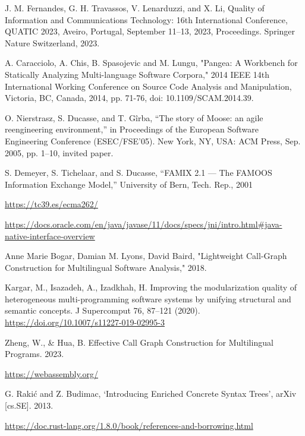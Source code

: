 \begin{thebibliography}{00}
    J. M. Fernandes, G. H. Travassos, V. Lenarduzzi, and X. Li, 
    Quality of Information and Communications Technology: 
    16th International Conference, QUATIC 2023,
    Aveiro, Portugal, September 11--13, 2023,
    Proceedings. Springer Nature Switzerland, 2023.

    A. Caracciolo, A. Chis, B. Spasojevic and
    M. Lungu, "Pangea: A Workbench for Statically Analyzing Multi-language Software Corpora,"
    2014 IEEE 14th International Working Conference on Source Code Analysis
    and Manipulation, Victoria, BC, Canada, 2014,
    pp. 71-76, doi: 10.1109/SCAM.2014.39.

    O. Nierstrasz, S. Ducasse, and T. Gîrba, “The story of Moose: an
    agile reengineering environment,” in Proceedings of the European
    Software Engineering Conference (ESEC/FSE’05). New York, NY,
    USA: ACM Press, Sep. 2005, pp. 1–10, invited paper.

    S. Demeyer, S. Tichelaar, and S. Ducasse, “FAMIX 2.1 — The FAMOOS
    Information Exchange Model,” University of Bern, Tech. Rep., 2001

    \url{https://tc39.es/ecma262/}

    \url{https://docs.oracle.com/en/java/javase/11/docs/specs/jni/intro.html#java-native-interface-overview}

    Anne Marie Bogar, Damian M. Lyons, David Baird,
    "Lightweight Call-Graph Construction for Multilingual Software Analysis," 2018.

    Kargar, M., Isazadeh, A., Izadkhah, H.
    Improving the modularization quality of heterogeneous multi-programming software systems by unifying structural and semantic concepts.
    J Supercomput 76, 87–121 (2020). \url{https://doi.org/10.1007/s11227-019-02995-3}

    Zheng, W., \& Hua, B. Effective Call Graph Construction for Multilingual Programs. 2023.

    \url{https://webassembly.org/}

    G. Rakić and Z. Budimac, ‘Introducing Enriched Concrete Syntax Trees’, arXiv [cs.SE]. 2013.

    \url{https://doc.rust-lang.org/1.8.0/book/references-and-borrowing.html}

\end{thebibliography}
\endgroup

\clearpage
